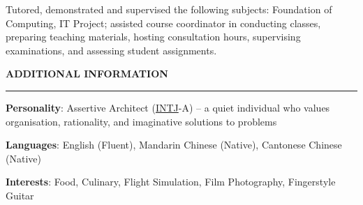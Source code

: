 \documentclass{cv}
\begin{document}
\begin{list}{}{\setlength{\leftmargin}{0pt}}
    \begin{list}{\raisebox{2.0pt}{\tiny$\bullet$}\space}{\setlength{\leftmargin}{11.2pt}}
        \itemsep -5.0pt \vspace{-4.0pt}
        \item Tutored, demonstrated and supervised the following subjects: Foundation of Computing, IT Project; assisted course coordinator in conducting classes, preparing teaching materials, hosting consultation hours, supervising examinations, and assessing student assignments.
    \end{list}
\end{list}


\sectionskip


\textbf{\uppercase{Additional Information}}
\sectionlineskip
\hrule height 0.6pt
\begin{list}{}{\setlength{\leftmargin}{0pt}}
\itemsep -4.0pt
\item
    \textbf{Personality}: Assertive Architect (\href{https://www.16personalities.com/intj-personality}{INTJ}-A) -- a quiet individual who values organisation, rationality, and imaginative solutions to problems
\item
    \textbf{Languages}: English (Fluent), Mandarin Chinese (Native), Cantonese Chinese (Native)
\item
    \textbf{Interests}: Food, Culinary, Flight Simulation, Film Photography, Fingerstyle Guitar
\end{list}

\end{document}
